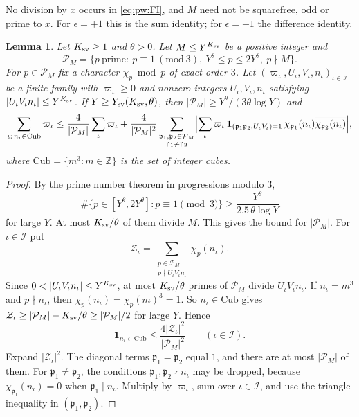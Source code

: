\documentclass{amsart}
\newtheorem{lemma}{Lemma}[section]
\theoremstyle{definition}
\theoremstyle{plain}
\numberwithin{equation}{section}
\numberwithin{table}{section}
\begin{document}
No division by $x$ occurs in \eqref{eq:pw:FI}, and $M$ need not be squarefree,
odd or prime to $x$. For $\epsilon=+1$ this is the sum identity; for
$\epsilon=-1$ the difference identity.

\begin{lemma}\label{lem:pw:sieve}
Let $K_{\rm sv}\ge1$ and $\theta>0$. Let $M\le Y^{K_{\rm sv}}$ be a positive integer and
\[
 \mathcal P_M=\{p\ \text{prime}:\ p\equiv1\ (\mathrm{mod}\ 3),\
 Y^\theta\le p\le2Y^\theta,\ p\nmid M\}.
\]
For $p\in\mathcal P_M$ fix a character $\chi_p\bmod p$ of exact order $3$. Let
$(\varpi_\iota,U_\iota,V_\iota,n_\iota)_{\iota\in\mathcal I}$ be a finite
family with $\varpi_\iota\ge0$ and nonzero integers
$U_\iota,V_\iota,n_\iota$ satisfying $|U_\iota V_\iota n_\iota|\le Y^{K_{\rm sv}}$. If
$Y\ge Y_{\rm sv}(K_{\rm sv},\theta)$, then $|\mathcal P_M|\ge Y^\theta/(3\theta\log Y)$ and
\begin{equation}\label{eq:pw:sieve}
 \sum_{\iota:\,n_\iota\in\mathrm{Cub}}\varpi_\iota
 \le\frac4{|\mathcal P_M|}\sum_\iota\varpi_\iota
 +\frac4{|\mathcal P_M|^2}\sum_{\substack{\mathfrak p_1,\mathfrak p_2\in\mathcal P_M\\\mathfrak p_1\ne \mathfrak p_2}}
 \Bigl|\sum_\iota\varpi_\iota\,\mathbf 1_{(\mathfrak p_1\mathfrak p_2,U_\iota V_\iota)=1}\,
 \chi_{\mathfrak p_1}(n_\iota)\overline{\chi_{\mathfrak p_2}(n_\iota)}\Bigr| ,
\end{equation}
where $\mathrm{Cub}=\{m^3:m\in\mathbb Z\}$ is the set of integer cubes.
\end{lemma}

\begin{proof}
By the prime number theorem in progressions modulo $3$,
\[
 \#\{p\in[Y^\theta,2Y^\theta]:p\equiv1\pmod3\}
 \ge\frac{Y^\theta}{2.5\,\theta\log Y}
\]
for large $Y$. At most $K_{\rm sv}/\theta$ of them divide $M$. This gives the bound
for $|\mathcal P_M|$. For $\iota\in\mathcal I$ put
\[
 \mathcal Z_\iota=\sum_{\substack{p\in\mathcal P_M\\ p\nmid U_\iota V_\iota n_\iota}}\chi_p(n_\iota).
\]
Since $0<|U_\iota V_\iota n_\iota|\le Y^{K_{\rm sv}}$, at most $K_{\rm sv}/\theta$ primes of $\mathcal P_M$
divide $U_\iota V_\iota n_\iota$. If $n_\iota=m^3$ and $p\nmid n_\iota$, then
$\chi_p(n_\iota)=\chi_p(m)^3=1$. So $n_\iota\in\mathrm{Cub}$ gives
$\mathcal Z_\iota\ge|\mathcal P_M|-K_{\rm sv}/\theta\ge|\mathcal P_M|/2$ for large $Y$. Hence
\[
 \mathbf 1_{n_\iota\in\mathrm{Cub}}\le\frac{4|\mathcal Z_\iota|^2}{|\mathcal P_M|^2}
\qquad(\iota\in\mathcal I).
\]
Expand $|\mathcal Z_\iota|^2$. The diagonal terms $\mathfrak p_1=\mathfrak p_2$ equal
$1$, and there are at most $|\mathcal P_M|$ of them. For
$\mathfrak p_1\ne\mathfrak p_2$, the conditions
$\mathfrak p_1,\mathfrak p_2\nmid n_\iota$ may be dropped, because
$\chi_{\mathfrak p_1}(n_\iota)=0$ when $\mathfrak p_1\mid n_\iota$. Multiply by
$\varpi_\iota$, sum over $\iota\in\mathcal I$, and use the triangle inequality in
$(\mathfrak p_1,\mathfrak p_2)$.
\end{proof}
\end{document}
